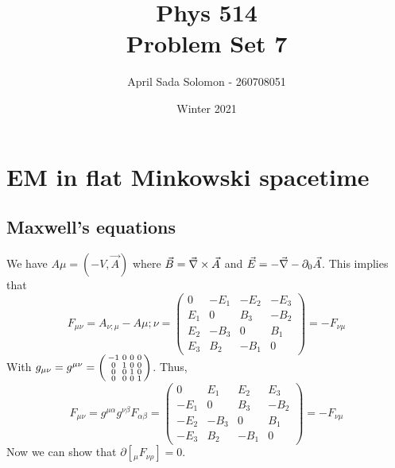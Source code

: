 \documentclass{article}
\title{Phys 514 \\
	\large Problem Set 7}
\author{April Sada Solomon - 260708051}
\date{Winter 2021}
\begin{document}
	\maketitle
	\thispagestyle{empty}
	\pagebreak
	
	\cfoot{\thepage}
	
	\tableofcontents
	\newpage
	
	
	\setcounter{page}{1}
	\cfoot{\thepage}
	
	\section{EM in flat Minkowski spacetime}
	\subsection{Maxwell's equations}
	We have $A\mu = (-V, \vec{A})$ where $\vec{B} = \vec{\nabla} \times \vec{A}$ and $\vec{E} = -\vec{\nabla} - \partial_0 \vec{A}$. This implies that
	\begin{equation}
		\label{eq:NewForce}
		F_{\mu\nu} = A_{\nu;\mu} - A{\mu;\nu} = 
		\begin{pmatrix}
			0 & -E_1 & -E_2 & -E_3 \\
			E_1 & 0 & B_3 & - B_2 \\
			E_2 & -B_3 & 0 & B_1 \\
			E_3 & B_2 & -B_1 & 0
		\end{pmatrix} = -F_{\nu\mu}
	\end{equation}
	With $g_{\mu\nu} = g^{\mu\nu} = \begin{psmallmatrix}
		-1 & 0 & 0 & 0 \\ 0 & 1& 0 & 0 \\ 0 & 0 & 1& 0 \\ 0 & 0 & 0 & 1
	\end{psmallmatrix}$. Thus,
	\begin{equation}
		\label{eq:MetricForce}
		F_{\mu\nu} = g^{\mu\alpha}g^{\nu\beta} F_{\alpha\beta} = 
		\begin{pmatrix}
			0 & E_1 & E_2 & E_3 \\
			-E_1 & 0 & B_3 & - B_2 \\
			-E_2 & -B_3 & 0 & B_1 \\
			-E_3 & B_2 & -B_1 & 0
		\end{pmatrix} = -F_{\nu\mu}
	\end{equation}
	Now we can show that $\partial \left[_\mu F_{\nu\rho} \right] = 0$.
\end{document}
